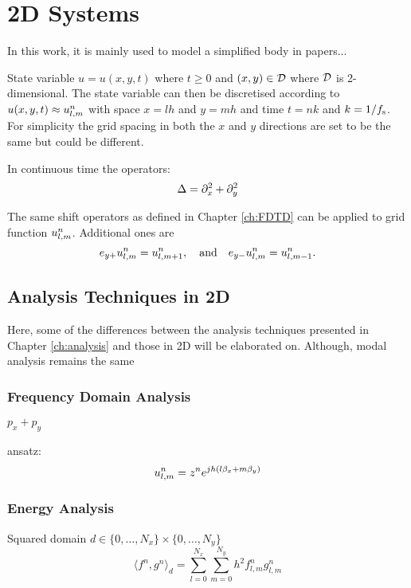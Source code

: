 \chapter{2D Systems}\label{ch:2Dsyst}


In this work, it is mainly used to model a simplified body in papers...


State variable $u = u(x,y,t)$  where $t\geq 0$ and $(x,y) \in \mathcal{D}$ where $\mathcal{D}$ is 2-dimensional. The state variable can then be discretised according to $u(x, y, t) \approx u_{l,m}^n$ with space $x = lh$ and $y = mh$ and time $t = nk$ and $k=1/f_\text{s}$. For simplicity the grid spacing in both the $x$ and $y$ directions are set to be the same but could be different.

In continuous time the  operators:
\begin{equation}\label{eq:laplacian}
    \Delta = \partial_x^2 + \partial_y^2
\end{equation}


The same shift operators as defined in Chapter \ref{ch:FDTD} can be applied to grid function $u_{l,m}^n$. Additional ones are
\begin{equation}
    e_{y+}u_{l,m}^n = u_{l, m+1}^n,\quad \text{and}\quad e_{y-}u_{l,m}^n= u_{l, m-1}^n.
\end{equation}

\section{Analysis Techniques in 2D}\label{sec:analysis2D}
Here, some of the differences between the analysis techniques presented in Chapter \ref{ch:analysis} and those in 2D will be elaborated on. Although, modal analysis remains the same

\subsection{Frequency Domain Analysis}
$p_x + p_y$

ansatz:
\begin{equation}
    u_{l,m}^n = z^n e^{jh(l\beta_x + m\beta_y)}
\end{equation}

\subsection{Energy Analysis}
Squared domain 
$d\in \{0, \hdots, N_x\} \times \{0, \hdots, N_y\}$
\begin{equation}\label{eq:2DInnerProd}
    \langle f^n, g^n \rangle_d = \sum_{l = 0}^{N_x}\sum_{m = 0}^{N_y} h^2 f_{l,m}^n g_{l,m}^n
\end{equation}

